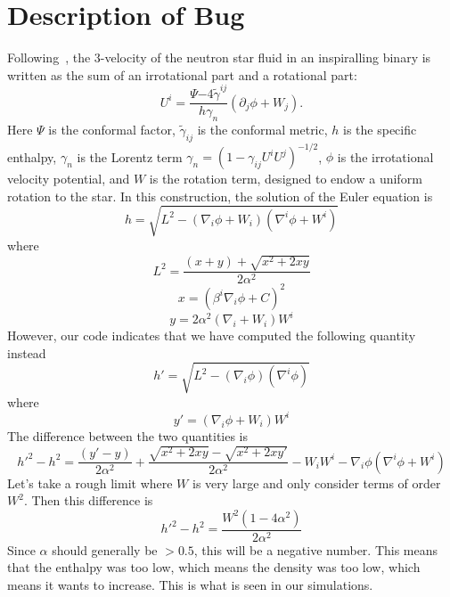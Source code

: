 \section{Description of Bug}
Following~\cite{Tichy:2012rp}, the 3-velocity of the neutron star fluid in an
inspiralling binary is written as the sum of an irrotational part and
a rotational part:
\begin{equation}
U^i =
\frac{\Psi{-4}\tilde{\gamma}^{ij}}{h\gamma_n}\left(\partial_j\phi +
  W_j\right).
\end{equation}
Here $\Psi$ is the conformal factor, $\tilde{\gamma}_{ij}$ is the
conformal metric, $h$ is the specific enthalpy, $\gamma_n$ is the
Lorentz term $\gamma_n=\left(1-\gamma_{ij}U^iU^j\right)^{-1/2}$,
$\phi$ is the irrotational velocity potential, and $W$ is the rotation
term, designed to endow a uniform rotation to the star. In this
construction, the solution of the Euler equation is
\begin{equation}
h=\sqrt{L^2-\left(\nabla_i\phi+W_i\right)\left(\nabla^i\phi+W^i\right)}
\end{equation}
where
\begin{equation}
L^2 = \frac{(x+y)+\sqrt{x^2+2xy}}{2\alpha^2}
\end{equation}
\begin{equation}
x=\left(\beta^i\nabla_i\phi+C\right)^2
\end{equation}
\begin{equation}
y=2\alpha^2\left(\nabla_i+W_i\right)W^i
\end{equation}
However, our code indicates that we have computed the following
quantity instead
\begin{equation}
h'=\sqrt{L^2-\left(\nabla_i\phi\right)\left(\nabla^i\phi\right)}
\end{equation}
where 
\begin{equation}
y'=\left(\nabla_i\phi+W_i\right)W^i
\end{equation}
The difference between the two quantities is
\begin{equation}
h'^2-h^2 =
\frac{\left(y'-y\right)}{2\alpha^2}+\frac{\sqrt{x^2+2xy}-\sqrt{x^2+2xy'}}{2\alpha^2}-W_iW^i-\nabla_i\phi\left(\nabla^i\phi+W^i\right)
\end{equation}
Let's take a rough limit where $W$ is very large and only consider
terms of order $W^2$.
Then this difference is 
\begin{equation}
h'^2-h^2 = \frac{W^2\left(1-4\alpha^2\right)}{2\alpha^2}
\end{equation}
Since $\alpha$ should generally be $>0.5$, this will be a negative
number. This means that the enthalpy was too low, which means the
density was too low, which means it wants to increase. This is what is
seen in our simulations.

